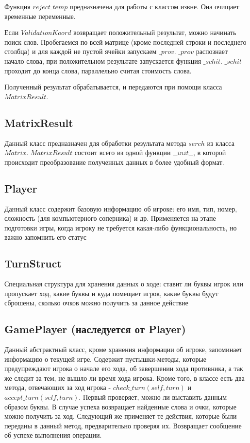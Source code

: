 \documentclass[a4paper,14pt]{article}
\begin{document}
	Функция $reject\_temp$ предназначена для работы с классом извне. Она очищает временные переменные.  
	
	Если $ValidationKoord$ возвращает положительный результат, можно начинать поиск слов. Пробегаемся по всей матрице (кроме последней строки и последнего столбца) и для каждой не пустой ячейки запускаем $\_prov$. $\_prov$ распознает начало слова, при положительном результате запускается функция $\_schit$. $\_schit$ проходит до конца слова, параллельно считая стоимость слова.
	
	Полученный результат обрабатывается, и передаются при помощи класса $MatrixResult$.
	
	\subsection{MatrixResult}
	Данный класс предназначен для обработки результата метода $serch$ из класса $Matrix$. $MatrixResult$ состоит всего из одной функции $\_\_init\_\_$, в которой происходит преобразование полученных данных в более удобный формат. 
	
	\subsection{Player}
	Данный класс содержит базовую информацию об игроке: его имя, тип, номер, сложность (для компьютерного соперника) и др. Применяется на этапе подготовки игры, когда игроку не требуется какая-либо функциональность, но важно запомнить его статус
	
	\subsection{TurnStruct}
	Специальная структура для хранения данных о ходе: ставит ли буквы игрок или пропускает ход, какие буквы и куда помещает игрок, какие буквы будут сброшены, сколько очков можно получить за данное действие
	
	\subsection[GamePlayer]{GamePlayer (наследуется от Player)}
	Данный абстрактный класс, кроме хранения информации об игроке, запоминает информацию о текущей игре. Содержит пустышки-методы, которые предупреждают игрока о начале его хода, об завершении хода противника, а так же следит за тем, не вышло ли время хода игрока. Кроме того, в классе есть два метода, отвечающих за ход игрока - $check\_turn(self, turn)$ и $accept\_turn(self, turn)$. Первый проверяет, можно ли выставить данным образом буквы. В случае успеха возвращает найденные слова и очки, которые можно получить за ход. Следующий же применяет те действия, которые были переданы в данный метод, предварительно проверяя их. Возвращает сообщение об успехе выполнения операции.
	
\end{document}
